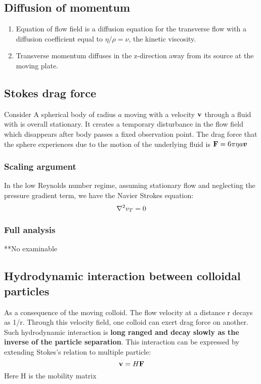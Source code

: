 \documentclass[12pt,a4paper]{article}
\begin{document}
        \subsection{Diffusion of momentum}
            \begin{enumerate}
                \item Equation of flow field is a diffusion equation for the transverse flow with a diffusion coefficient equal to $\eta/\rho=\nu$, the kinetic viscosity.
                \item Transverse momentum diffuses in the z-direction away from its source at the moving plate.
            \end{enumerate}    
        \subsection{Stokes drag force}
            Consider A spherical body of radius $a$ moving with a velocity $\vb{v}$ through a fluid with is overall stationary. It creates a temporary disturbance in the flow field which disappears after body passes a fixed observation point. The drag force that the sphere experiences due to the motion of the underlying fluid is $\vb{F} = 6\pi \eta a \vb*{v}$
            \subsubsection{Scaling argument}
            In the low Reynolds number regime, assuming stationary flow and neglecting the pressure gradient term, we have the Navier Strokes equation:
            $$
                \laplacian{v_T}=0 
            $$
            \subsubsection{Full analysis}
            **No examinable
        \subsection{Hydrodynamic interaction between colloidal particles}
            As a consequence of the moving colloid. The flow velocity at a distance r decays as 1/r. Through this velocity field, one colloid can exert drag force on another. Such hydrodynamic interaction is \textbf{long ranged and decay slowly as the inverse of the particle separation}.
            This interaction can be expressed by extending Stokes's relation to multiple particle:
            $$
                \vb{v} = H \vb{F}
            $$
            Here H is the mobility matrix
\end{document}
